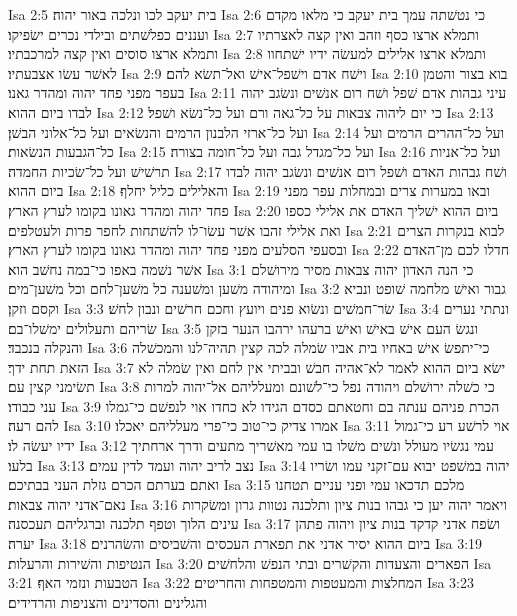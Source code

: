 Isa 2:5  בית יעקב לכו ונלכה באור יהוה׃
Isa 2:6  כי נטשׁתה עמך בית יעקב כי מלאו מקדם ועננים כפלשׁתים ובילדי נכרים ישׂפיקו׃
Isa 2:7  ותמלא ארצו כסף וזהב ואין קצה לאצרתיו ותמלא ארצו סוסים ואין קצה למרכבתיו׃
Isa 2:8  ותמלא ארצו אלילים למעשׂה ידיו ישׁתחוו לאשׁר עשׂו אצבעתיו׃
Isa 2:9  וישׁח אדם וישׁפל־אישׁ ואל־תשׂא להם׃
Isa 2:10  בוא בצור והטמן בעפר מפני פחד יהוה ומהדר גאנו׃
Isa 2:11  עיני גבהות אדם שׁפל ושׁח רום אנשׁים ונשׂגב יהוה לבדו ביום ההוא׃
Isa 2:12  כי יום ליהוה צבאות על כל־גאה ורם ועל כל־נשׂא ושׁפל׃
Isa 2:13  ועל כל־ארזי הלבנון הרמים והנשׂאים ועל כל־אלוני הבשׁן׃
Isa 2:14  ועל כל־ההרים הרמים ועל כל־הגבעות הנשׂאות׃
Isa 2:15  ועל כל־מגדל גבה ועל כל־חומה בצורה׃
Isa 2:16  ועל כל־אניות תרשׁישׁ ועל כל־שׂכיות החמדה׃
Isa 2:17  ושׁח גבהות האדם ושׁפל רום אנשׁים ונשׂגב יהוה לבדו ביום ההוא׃
Isa 2:18  והאלילים כליל יחלף׃
Isa 2:19  ובאו במערות צרים ובמחלות עפר מפני פחד יהוה ומהדר גאונו בקומו לערץ הארץ׃
Isa 2:20  ביום ההוא ישׁליך האדם את אלילי כספו ואת אלילי זהבו אשׁר עשׂו־לו להשׁתחות לחפר פרות ולעטלפים׃
Isa 2:21  לבוא בנקרות הצרים ובסעפי הסלעים מפני פחד יהוה ומהדר גאונו בקומו לערץ הארץ׃
Isa 2:22  חדלו לכם מן־האדם אשׁר נשׁמה באפו כי־במה נחשׁב הוא׃
Isa 3:1  כי הנה האדון יהוה צבאות מסיר מירושׁלם ומיהודה משׁען ומשׁענה כל משׁען־לחם וכל משׁען־מים׃
Isa 3:2  גבור ואישׁ מלחמה שׁופט ונביא וקסם וזקן׃
Isa 3:3  שׂר־חמשׁים ונשׂוא פנים ויועץ וחכם חרשׁים ונבון לחשׁ׃
Isa 3:4  ונתתי נערים שׂריהם ותעלולים ימשׁלו־בם׃
Isa 3:5  ונגשׂ העם אישׁ באישׁ ואישׁ ברעהו ירהבו הנער בזקן והנקלה בנכבד׃
Isa 3:6  כי־יתפשׂ אישׁ באחיו בית אביו שׂמלה לכה קצין תהיה־לנו והמכשׁלה הזאת תחת ידך׃
Isa 3:7  ישׂא ביום ההוא לאמר לא־אהיה חבשׁ ובביתי אין לחם ואין שׂמלה לא תשׂימני קצין עם׃
Isa 3:8  כי כשׁלה ירושׁלם ויהודה נפל כי־לשׁונם ומעלליהם אל־יהוה למרות עני כבודו׃
Isa 3:9  הכרת פניהם ענתה בם וחטאתם כסדם הגידו לא כחדו אוי לנפשׁם כי־גמלו להם רעה׃
Isa 3:10  אמרו צדיק כי־טוב כי־פרי מעלליהם יאכלו׃
Isa 3:11  אוי לרשׁע רע כי־גמול ידיו יעשׂה לו׃
Isa 3:12  עמי נגשׂיו מעולל ונשׁים משׁלו בו עמי מאשׁריך מתעים ודרך ארחתיך בלעו׃
Isa 3:13  נצב לריב יהוה ועמד לדין עמים׃
Isa 3:14  יהוה במשׁפט יבוא עם־זקני עמו ושׂריו ואתם בערתם הכרם גזלת העני בבתיכם׃
Isa 3:15  מלכם תדכאו עמי ופני עניים תטחנו נאם־אדני יהוה צבאות׃
Isa 3:16  ויאמר יהוה יען כי גבהו בנות ציון ותלכנה נטוות גרון ומשׂקרות עינים הלוך וטפף תלכנה וברגליהם תעכסנה׃
Isa 3:17  ושׂפח אדני קדקד בנות ציון ויהוה פתהן יערה׃
Isa 3:18  ביום ההוא יסיר אדני את תפארת העכסים והשׁביסים והשׂהרנים׃
Isa 3:19  הנטיפות והשׁירות והרעלות׃
Isa 3:20  הפארים והצעדות והקשׁרים ובתי הנפשׁ והלחשׁים׃
Isa 3:21  הטבעות ונזמי האף׃
Isa 3:22  המחלצות והמעטפות והמטפחות והחריטים׃
Isa 3:23  והגלינים והסדינים והצניפות והרדידים׃
